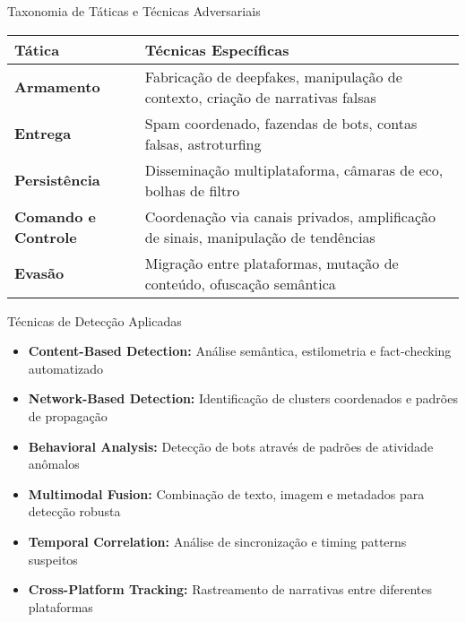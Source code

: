 \documentclass[aspectratio=169,xcolor=table]{beamer}
\begin{document}
\begin{frame}{Taxonomia de Táticas e Técnicas Adversariais}
    \begin{table}
        \begin{tabularx}{\textwidth}{|l|X|}
            \hline
            \textbf{Tática} & \textbf{Técnicas Específicas} \\
            \hline
            \textbf{Armamento} & Fabricação de deepfakes, manipulação de contexto, criação de narrativas falsas \\
            \hline
            \textbf{Entrega} & Spam coordenado, fazendas de bots, contas falsas, astroturfing \\
            \hline
            \textbf{Persistência} & Disseminação multiplataforma, câmaras de eco, bolhas de filtro \\
            \hline
            \textbf{Comando e Controle} & Coordenação via canais privados, amplificação de sinais, manipulação de tendências \\
            \hline
            \textbf{Evasão} & Migração entre plataformas, mutação de conteúdo, ofuscação semântica \\
            \hline
        \end{tabularx}
    \end{table}
\end{frame}

\begin{frame}{Técnicas de Detecção Aplicadas}
    \begin{itemize}
        \item \textbf{Content-Based Detection:} Análise semântica, estilometria e fact-checking automatizado
        \item \textbf{Network-Based Detection:} Identificação de clusters coordenados e padrões de propagação
        \item \textbf{Behavioral Analysis:} Detecção de bots através de padrões de atividade anômalos
        \item \textbf{Multimodal Fusion:} Combinação de texto, imagem e metadados para detecção robusta
        \item \textbf{Temporal Correlation:} Análise de sincronização e timing patterns suspeitos
        \item \textbf{Cross-Platform Tracking:} Rastreamento de narrativas entre diferentes plataformas
    \end{itemize}
\end{frame}
\end{document}
